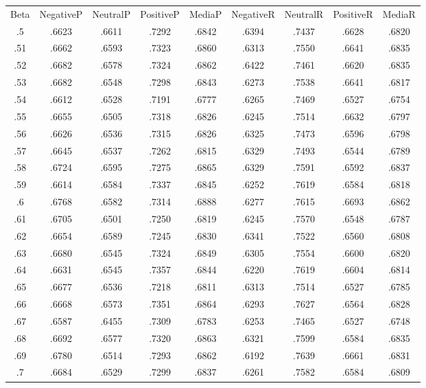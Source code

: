 \documentclass[a4paper,10pt]{article} %
\begin{document}
\begin{tabular} {ccccccccc}

Beta & NegativeP & NeutralP & PositiveP & MediaP & NegativeR & NeutralR & PositiveR & MediaR \\
    .5  & .6623 & .6611 & .7292 & .6842 & .6394 & .7437 & .6628 & .6820  \\
    .51  & .6662 & .6593 & .7323 & .6860 & .6313 & .7550 & .6641 & .6835  \\
    .52  & .6682 & .6578 & .7324 & .6862 & .6422 & .7461 & .6620 & .6835  \\
    .53  & .6682 & .6548 & .7298 & .6843 & .6273 & .7538 & .6641 & .6817  \\
    .54  & .6612 & .6528 & .7191 & .6777 & .6265 & .7469 & .6527 & .6754  \\
    .55  & .6655 & .6505 & .7318 & .6826 & .6245 & .7514 & .6632 & .6797  \\
    .56  & .6626 & .6536 & .7315 & .6826 & .6325 & .7473 & .6596 & .6798  \\
    .57  & .6645 & .6537 & .7262 & .6815 & .6329 & .7493 & .6544 & .6789  \\
    .58  & .6724 & .6595 & .7275 & .6865 & .6329 & .7591 & .6592 & .6837  \\
    .59  & .6614 & .6584 & .7337 & .6845 & .6252 & .7619 & .6584 & .6818  \\
    .6  & .6768 & .6582 & .7314 & .6888 & .6277 & .7615 & .6693 & .6862 \\
    .61  & .6705 & .6501 & .7250 & .6819 & .6245 & .7570 & .6548 & .6787  \\
    .62  & .6654 & .6589 & .7245 & .6830 & .6341 & .7522 & .6560 & .6808  \\
    .63  & .6680 & .6545 & .7324 & .6849 & .6305 & .7554 & .6600 & .6820  \\
    .64  & .6631 & .6545 & .7357 & .6844 & .6220 & .7619 & .6604 & .6814  \\
    .65  & .6677 & .6536 & .7218 & .6811 & .6313 & .7514 & .6527 & .6785  \\
    .66  & .6668 & .6573 & .7351 & .6864 & .6293 & .7627 & .6564 & .6828  \\
    .67  & .6587 & .6455 & .7309 & .6783 & .6253 & .7465 & .6527 & .6748  \\
    .68  & .6692 & .6577 & .7320 & .6863 & .6321 & .7599 & .6584 & .6835  \\
    .69  & .6780 & .6514 & .7293 & .6862 & .6192 & .7639 & .6661 & .6831  \\
    .7  & .6684 & .6529 & .7299 & .6837 & .6261 & .7582 & .6584 & .6809 \\

\end{tabular}
\end{document}
